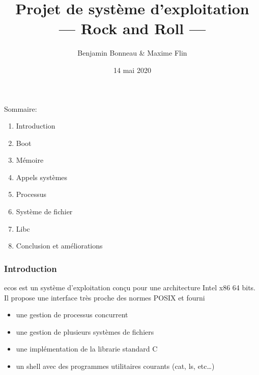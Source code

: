 \documentclass[10pt,a4paper]{beamer}
\author{Benjamin Bonneau \& Maxime Flin }
\title{Projet de système d'exploitation \\ --- Rock and Roll ---}
\date{14 mai 2020}
\begin{document}
\maketitle

\begin{frame}
  Sommaire:
  \begin{enumerate}
  \item Introduction
  \item Boot
  \item Mémoire
  \item Appels systèmes
  \item Processus
  \item Système de fichier
  \item Libc
  \item Conclusion et améliorations
  \end{enumerate}
\end{frame}

\begin{frame}
  \frametitle{Introduction}
  \textrm{ecos} est un système d'exploitation conçu pour une architecture Intel \textrm{x86} 64 bits. Il propose une interface très proche des normes \textrm{POSIX} et fourni
  \begin{itemize}
  \item une gestion de processus concurrent
  \item une gestion de plusieurs systèmes de fichiers
  \item une implémentation de la librarie standard C
  \item un shell avec des programmes utilitaires courants (\textrm{cat}, \textrm{ls}, etc\ldots)
  \end{itemize}
\end{frame}
\end{document}
